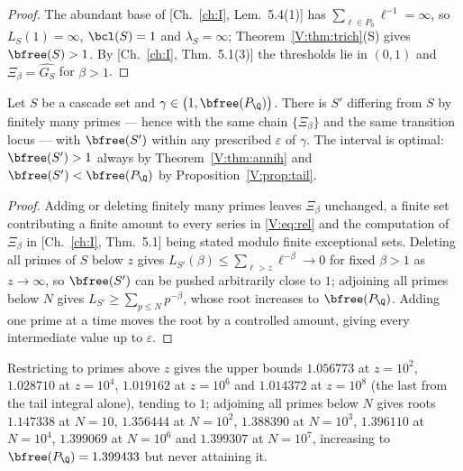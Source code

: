\begin{proof}
The abundant base of [Ch.~\ref{ch:I}, Lem.~5.4(1)] has $\sum_{\ell\in P_0}\ell^{-1}=\infty$, so
$L_S(1)=\infty$, $\bcl(S)=1$ and $\lambda_S=\infty$; Theorem~\ref{V:thm:trich}(S) gives
$\bfree(S)>1$. By [Ch.~\ref{ch:I}, Thm.~5.1(3)] the thresholds lie in $(0,1)$ and
$\Xi_\beta=\widehat{G_S}$ for $\beta>1$.
\end{proof}

\begin{theorem}\label{V:thm:tune}
Let $S$ be a cascade set and $\gamma\in\bigl(1,\bfree(P_\Q)\bigr)$. There is $S'$ differing
from $S$ by finitely many primes --- hence with the same chain $\{\Xi_\beta\}$ and the same
transition locus --- with $\bfree(S')$ within any prescribed $\varepsilon$ of $\gamma$. The
interval is optimal: $\bfree(S')>1$ always by Theorem~\ref{V:thm:annih} and
$\bfree(S')<\bfree(P_\Q)$ by Proposition~\ref{V:prop:tail}.
\end{theorem}

\begin{proof}
Adding or deleting finitely many primes leaves $\Xi_\beta$ unchanged, a finite set
contributing a finite amount to every series in \eqref{V:eq:rel} and the computation of
$\Xi_\beta$ in [Ch.~\ref{ch:I}, Thm.~5.1] being stated modulo finite exceptional sets.
Deleting all primes of $S$ below $z$ gives
$L_{S'}(\beta)\le\sum_{\ell>z}\ell^{-\beta}\to0$ for fixed $\beta>1$ as $z\to\infty$, so
$\bfree(S')$ can be pushed arbitrarily close to $1$; adjoining all primes below $N$ gives
$L_{S'}\ge\sum_{p\le N}p^{-\beta}$, whose root increases to $\bfree(P_\Q)$. Adding one prime
at a time moves the root by a controlled amount, giving every intermediate value up to
$\varepsilon$.
\end{proof}

\begin{remark}\label{V:rem:tuning}
Restricting to primes above $z$ gives the upper bounds $1.056773$ at $z=10^2$, $1.028710$ at
$z=10^4$, $1.019162$ at $z=10^6$ and $1.014372$ at $z=10^8$ (the last from the tail
integral alone), tending to $1$; adjoining all
primes below $N$ gives roots $1.147338$ at $N=10$, $1.356444$ at $N=10^2$, $1.388390$ at
$N=10^3$, $1.396110$ at $N=10^4$, $1.399069$ at $N=10^6$ and $1.399307$ at $N=10^7$,
increasing to $\bfree(P_\Q)=1.399433$ but never attaining it.
\end{remark}

